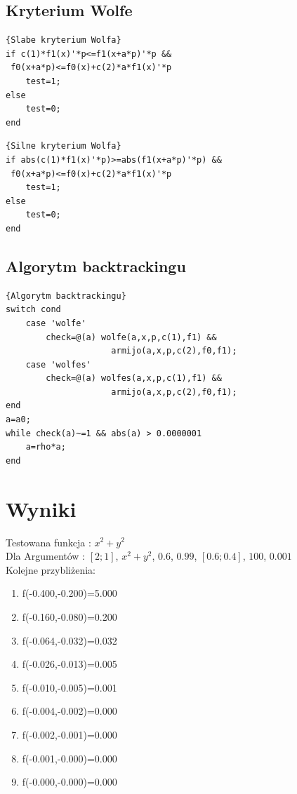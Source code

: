 \documentclass{classrep}
\begin{document}
\subsection{Kryterium Wolfe}

\begin{lstlisting}{Slabe kryterium Wolfa}
if c(1)*f1(x)'*p<=f1(x+a*p)'*p &&
 f0(x+a*p)<=f0(x)+c(2)*a*f1(x)'*p
    test=1;
else 
    test=0;
end
\end{lstlisting}

\begin{lstlisting}{Silne kryterium Wolfa}
if abs(c(1)*f1(x)'*p)>=abs(f1(x+a*p)'*p) &&
 f0(x+a*p)<=f0(x)+c(2)*a*f1(x)'*p
    test=1;
else 
    test=0;
end
\end{lstlisting}

\subsection{Algorytm backtrackingu}

\begin{lstlisting}{Algorytm backtrackingu}
switch cond
    case 'wolfe'
        check=@(a) wolfe(a,x,p,c(1),f1) &&
        			 armijo(a,x,p,c(2),f0,f1);
    case 'wolfes'
        check=@(a) wolfes(a,x,p,c(1),f1) &&
        			 armijo(a,x,p,c(2),f0,f1);
end
a=a0;
while check(a)~=1 && abs(a) > 0.0000001
    a=rho*a;
end
\end{lstlisting}

\section{Wyniki}

Testowana funkcja : $x^2+y^2$\\
Dla Argumentów : $[2;1]$, $x^2+y^2$, $0.6$, $0.99$, $[0.6;0.4]$, $100$, $0.001$\\
Kolejne przybliżenia:
\begin{enumerate}
\item f(-0.400,-0.200)=5.000
\item f(-0.160,-0.080)=0.200
\item f(-0.064,-0.032)=0.032
\item f(-0.026,-0.013)=0.005
\item f(-0.010,-0.005)=0.001
\item f(-0.004,-0.002)=0.000
\item f(-0.002,-0.001)=0.000
\item f(-0.001,-0.000)=0.000
\item f(-0.000,-0.000)=0.000
\end{enumerate}
\end{document}

